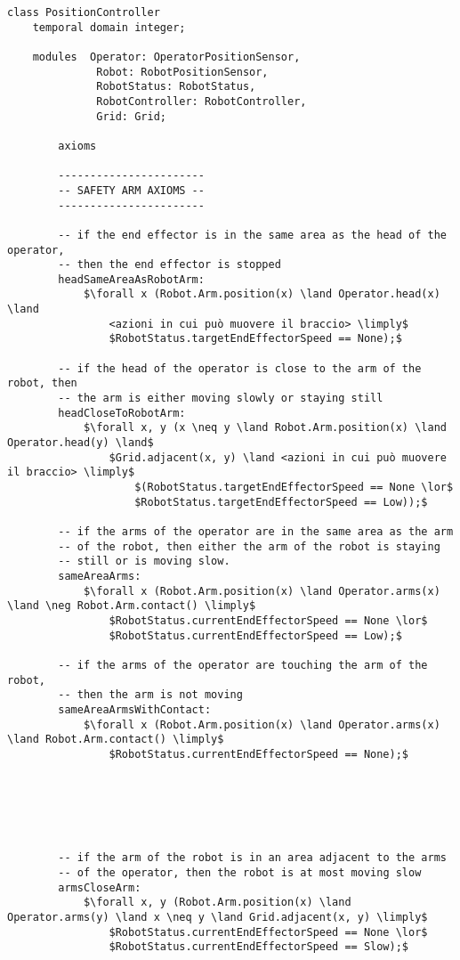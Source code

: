 \begin{lstlisting}[fontadjust, mathescape, frame=single] 
class PositionController
    temporal domain integer;

    modules  Operator: OperatorPositionSensor,
              Robot: RobotPositionSensor,
              RobotStatus: RobotStatus,
              RobotController: RobotController,
              Grid: Grid;
    
        axioms
    
        -----------------------
        -- SAFETY ARM AXIOMS --
        -----------------------
        
        -- if the end effector is in the same area as the head of the operator,
        -- then the end effector is stopped
        headSameAreaAsRobotArm:
            $\forall x (Robot.Arm.position(x) \land Operator.head(x) \land
                <azioni in cui può muovere il braccio> \limply$
                $RobotStatus.targetEndEffectorSpeed == None);$

        -- if the head of the operator is close to the arm of the robot, then
        -- the arm is either moving slowly or staying still
        headCloseToRobotArm:
            $\forall x, y (x \neq y \land Robot.Arm.position(x) \land Operator.head(y) \land$
                $Grid.adjacent(x, y) \land <azioni in cui può muovere il braccio> \limply$
                    $(RobotStatus.targetEndEffectorSpeed == None \lor$
                    $RobotStatus.targetEndEffectorSpeed == Low));$

        -- if the arms of the operator are in the same area as the arm
        -- of the robot, then either the arm of the robot is staying
        -- still or is moving slow.
        sameAreaArms:
            $\forall x (Robot.Arm.position(x) \land Operator.arms(x) \land \neg Robot.Arm.contact() \limply$
                $RobotStatus.currentEndEffectorSpeed == None \lor$
                $RobotStatus.currentEndEffectorSpeed == Low);$

        -- if the arms of the operator are touching the arm of the robot,
        -- then the arm is not moving
        sameAreaArmsWithContact:
            $\forall x (Robot.Arm.position(x) \land Operator.arms(x) \land Robot.Arm.contact() \limply$
                $RobotStatus.currentEndEffectorSpeed == None);$






        -- if the arm of the robot is in an area adjacent to the arms
        -- of the operator, then the robot is at most moving slow
        armsCloseArm:
            $\forall x, y (Robot.Arm.position(x) \land Operator.arms(y) \land x \neq y \land Grid.adjacent(x, y) \limply$
                $RobotStatus.currentEndEffectorSpeed == None \lor$
                $RobotStatus.currentEndEffectorSpeed == Slow);$


\end{lstlisting}
